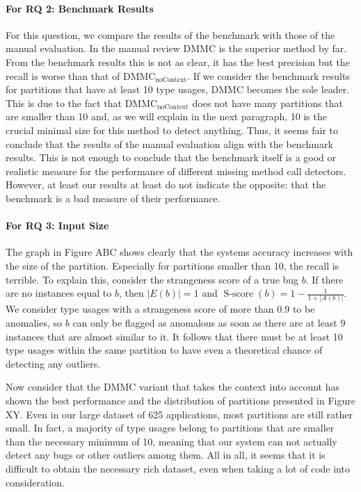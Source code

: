\paragraph{For RQ 2: Benchmark Results}

For this question, we compare the results of the benchmark with those of the manual evaluation.
In the manual review $\text{DMMC}$ is the superior method by far.
From the benchmark results this is not as clear, it has the best precision but the recall is worse than that of $\text{DMMC}_\text{noContext}$.
If we consider the benchmark results for partitions that have at least 10 type usages, $\text{DMMC}$ becomes the sole leader.
This is due to the fact that $\text{DMMC}_\text{noContext}$ does not have many partitions that are smaller than 10 and, as we will explain in the next paragraph, 10 is the crucial minimal size for this method to detect anything.
Thus, it seems fair to conclude that the results of the manual evaluation align with the benchmark results.
This is not enough to conclude that the benchmark itself is a good or realistic measure for the performance of different missing method call detectors.
However, at least our results at least do not indicate the opposite: that the benchmark is a bad measure of their performance.

\paragraph{For RQ 3: Input Size}

The graph in Figure ABC shows clearly that the systems accuracy increases with the size of the partition.
Especially for partitions smaller than 10, the recall is terrible.
To explain this, consider the strangeness score of a true bug $b$.
If there are no instances equal to $b$, then $|E(b)|=1$ and $\operatorname{S-score}(b)=1-\frac{1}{1+|A(b)|}$.
We consider type usages with a strangeness score of more than $0.9$ to be anomalies, so $b$ can only be flagged as anomalous as soon as there are at least $9$ instances that are almost similar to it.
It follows that there must be at least 10 type usages within the same partition to have even a theoretical chance of detecting any outliers.

Now consider that the $\text{DMMC}$ variant that takes the context into account has shown the best performance and the distribution of partitions presented in Figure XY.
Even in our large dataset of 625 applications, most partitions are still rather small.
In fact, a majority of type usages belong to partitions that are smaller than the necessary minimum of 10, meaning that our system can not actually detect any bugs or other outliers among them.
All in all, it seems that it is difficult to obtain the necessary rich dataset, even when taking a lot of code into consideration.

